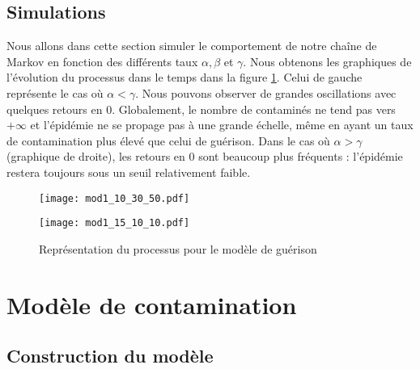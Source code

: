 \documentclass[12pt,a4paper]{report}
\theoremstyle{remark}
\begin{document}
\subsection{Simulations}
\vspace{0.6cm}

Nous allons dans cette section simuler le comportement de notre chaîne de Markov en fonction des différents taux $\alpha, \beta$ et $ \gamma$. Nous obtenons les graphiques de l'évolution du processus dans le temps dans la figure \ref{fig_guerison}. Celui de gauche représente le cas où $\alpha < \gamma$. Nous pouvons observer de grandes oscillations avec quelques retours en $0$. Globalement, le nombre de contaminés ne tend pas vers $+\infty$ et l'épidémie ne se propage pas à une grande échelle, même en ayant un taux de contamination plus élevé que celui de guérison. Dans le cas où $\alpha > \gamma$ (graphique de droite), les retours en $0$ sont beaucoup plus fréquents : l'épidémie restera toujours sous un seuil relativement faible.

\begin{figure}[h]
    \begin{minipage}[c]{0.25\linewidth}
        \centering
        \texttt{[image: mod1\_10\_30\_50.pdf]}
    \end{minipage}
    \hfill%
    \vspace{0.1cm}
    \begin{minipage}[c]{0.50\linewidth}
        \centering
       \texttt{[image: mod1\_15\_10\_10.pdf]}
    \end{minipage}
    \caption{Représentation du processus pour le modèle de guérison}
    \label{fig_guerison}
\end{figure}  


\section{Modèle de contamination}

\subsection{Construction du modèle}
\vspace{0.6cm}
\end{document}
